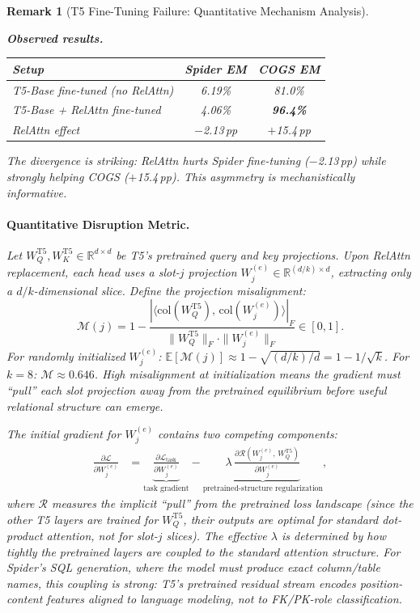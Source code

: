 \documentclass[conference]{IEEEtran}
\newtheorem{remark}{Remark}
\begin{document}
\iffalse
\begin{remark}[T5 Fine-Tuning Failure: Quantitative Mechanism Analysis]
\label{thm:app3}

\textbf{Observed results.}
\begin{center}
\begin{tabular}{lcc}
\toprule
\textbf{Setup} & \textbf{Spider EM} & \textbf{COGS EM} \\
\midrule
T5-Base fine-tuned (no RelAttn) & 6.19\% & 81.0\% \\
T5-Base + RelAttn fine-tuned    & 4.06\% & \textbf{96.4\%} \\
\midrule
RelAttn effect & $-$2.13\,pp & $+$15.4\,pp \\
\bottomrule
\end{tabular}
\end{center}

The divergence is striking: RelAttn \emph{hurts} Spider fine-tuning ($-$2.13\,pp) while strongly \emph{helping} COGS ($+$15.4\,pp). This asymmetry is mechanistically informative.

\paragraph{Quantitative Disruption Metric.}
Let $W_Q^\mathrm{T5}, W_K^\mathrm{T5} \in \mathbb{R}^{d \times d}$ be T5's pretrained query and key projections. Upon RelAttn replacement, each head uses a slot-$j$ projection $W_j^{(e)} \in \mathbb{R}^{(d/k)\times d}$, extracting only a $d/k$-dimensional slice. Define the \emph{projection misalignment}:
\[
  \mathcal{M}(j) = 1 - \frac{|\langle \mathrm{col}(W_Q^\mathrm{T5}),\, \mathrm{col}(W_j^{(e)}) \rangle|_F}{\|W_Q^\mathrm{T5}\|_F \cdot \|W_j^{(e)}\|_F}
  \in [0, 1].
\]
For randomly initialized $W_j^{(e)}$: $\mathbb{E}[\mathcal{M}(j)] \approx 1 - \sqrt{(d/k)/d} = 1 - 1/\sqrt{k}$. For $k{=}8$: $\mathcal{M} \approx 0.646$. High misalignment at initialization means the gradient must ``pull'' each slot projection away from the pretrained equilibrium before useful relational structure can emerge.

The initial gradient for $W_j^{(e)}$ contains two competing components:
\begin{align}
  \frac{\partial \mathcal{L}}{\partial W_j^{(e)}} &= \underbrace{\frac{\partial \mathcal{L}_\mathrm{task}}{\partial W_j^{(e)}}}_{\text{task gradient}} - \underbrace{\lambda \, \frac{\partial \mathcal{R}(W_j^{(e)},\, W_Q^\mathrm{T5})}{\partial W_j^{(e)}}}_{\text{pretrained-structure regularization}}, \label{eq:grad_decomp}
\end{align}
where $\mathcal{R}$ measures the implicit ``pull'' from the pretrained loss landscape (since the other T5 layers are trained for $W_Q^\mathrm{T5}$, their outputs are optimal for standard dot-product attention, not for slot-$j$ slices). The effective $\lambda$ is determined by how tightly the pretrained layers are coupled to the standard attention structure. For Spider's SQL generation, where the model must produce exact column/table names, this coupling is strong: T5's pretrained residual stream encodes position-content features aligned to language modeling, not to FK/PK-role classification.


\end{remark}
\end{document}
